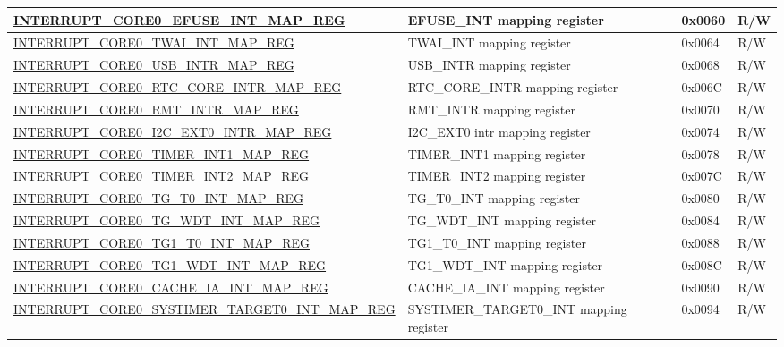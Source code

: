 \begin{longtable}{ | p{10cm} | m{9cm} | m{1.3cm} | m{1.0cm} | }
\hyperref[regdesc:INTERRUPTCORE0EFUSEINTMAPREG]{INTERRUPT\_CORE0\_EFUSE\_INT\_MAP\_REG} & EFUSE\_INT mapping register & 0x0060 & R/W \\ \hline
\hyperref[regdesc:INTERRUPTCORE0TWAIINTMAPREG]{INTERRUPT\_CORE0\_TWAI\_INT\_MAP\_REG} & TWAI\_INT mapping register & 0x0064 & R/W \\ \hline
\hyperref[regdesc:INTERRUPTCORE0USBINTRMAPREG]{INTERRUPT\_CORE0\_USB\_INTR\_MAP\_REG} & USB\_INTR mapping register & 0x0068 & R/W \\ \hline
\hyperref[regdesc:INTERRUPTCORE0RTCCOREINTRMAPREG]{INTERRUPT\_CORE0\_RTC\_CORE\_INTR\_MAP\_REG} & RTC\_CORE\_INTR mapping register & 0x006C & R/W \\ \hline
\hyperref[regdesc:INTERRUPTCORE0RMTINTRMAPREG]{INTERRUPT\_CORE0\_RMT\_INTR\_MAP\_REG} & RMT\_INTR mapping register & 0x0070 & R/W \\ \hline
\hyperref[regdesc:INTERRUPTCORE0I2CEXT0INTRMAPREG]{INTERRUPT\_CORE0\_I2C\_EXT0\_INTR\_MAP\_REG} & I2C\_EXT0 intr mapping register & 0x0074 & R/W \\ \hline
\hyperref[regdesc:INTERRUPTCORE0TIMERINT1MAPREG]{INTERRUPT\_CORE0\_TIMER\_INT1\_MAP\_REG} & TIMER\_INT1 mapping register & 0x0078 & R/W \\ \hline
\hyperref[regdesc:INTERRUPTCORE0TIMERINT2MAPREG]{INTERRUPT\_CORE0\_TIMER\_INT2\_MAP\_REG} & TIMER\_INT2 mapping register & 0x007C & R/W \\ \hline
\hyperref[regdesc:INTERRUPTCORE0TGT0INTMAPREG]{INTERRUPT\_CORE0\_TG\_T0\_INT\_MAP\_REG} & TG\_T0\_INT mapping register & 0x0080 & R/W \\ \hline
\hyperref[regdesc:INTERRUPTCORE0TGWDTINTMAPREG]{INTERRUPT\_CORE0\_TG\_WDT\_INT\_MAP\_REG} & TG\_WDT\_INT mapping register & 0x0084 & R/W \\ \hline
\hyperref[regdesc:INTERRUPTCORE0TG1T0INTMAPREG]{INTERRUPT\_CORE0\_TG1\_T0\_INT\_MAP\_REG} & TG1\_T0\_INT mapping register & 0x0088 & R/W \\ \hline
\hyperref[regdesc:INTERRUPTCORE0TG1WDTINTMAPREG]{INTERRUPT\_CORE0\_TG1\_WDT\_INT\_MAP\_REG} & TG1\_WDT\_INT mapping register & 0x008C & R/W \\ \hline
\hyperref[regdesc:INTERRUPTCORE0CACHEIAINTMAPREG]{INTERRUPT\_CORE0\_CACHE\_IA\_INT\_MAP\_REG} & CACHE\_IA\_INT mapping register & 0x0090 & R/W \\ \hline
\hyperref[regdesc:INTERRUPTCORE0SYSTIMERTARGET0INTMAPREG]{INTERRUPT\_CORE0\_SYSTIMER\_TARGET0\_INT\_MAP\_REG} & SYSTIMER\_TARGET0\_INT mapping register & 0x0094 & R/W \\ \hline

\end{longtable}
